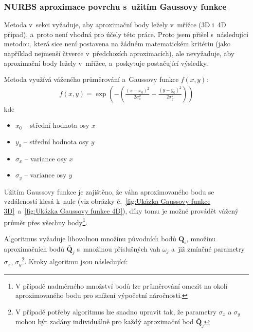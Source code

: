 \subsubsection{NURBS aproximace povrchu s~užitím Gaussovy funkce}\label{section: gauss surface approximation 3D}
Metoda v~sekci  vyžaduje, aby aproximační
body ležely v~mřížce (3D i~4D případ), a~proto není vhodná pro účely této
práce. Proto jsem přišel s~následující metodou, která sice není postavena na
žádném matematickém kritériu (jako například nejmenší čtverce v~předchozích
aproximacích), ale nevyžaduje, aby aproximační body ležely v~mřížce, a~poskytuje
postačující výsledky. \par Metoda využívá váženého průměrování a~Gaussovy
funkce $f(x, y)$:
\begin{align}
    f(x,y) = \exp\left(-\left(\frac{(x - x_0)^2}{2\sigma_x^2} + \frac{(y - y_0)^2}{2\sigma_y^2}\right)\right)
\end{align}
kde
\begin{itemize}
    \item $x_0$ -- střední hodnota osy $x$
    \item $y_0$ -- střední hodnota osy $y$
    \item $\sigma_x$ -- variance osy $x$
    \item $\sigma_y$ -- variance osy $y$
\end{itemize}
Užitím Gaussovy funkce je zajištěno, že váha aproximovaného bodu se vzdáleností klesá k~nule
(viz obrázky č.~\ref{fig:Ukázka Gaussovy funkce 3D}~a~\ref{fig:Ukázka Gaussovy funkce 4D}),
díky tomu je možné provádět vážený průměr přes všechny body\footnote{V případě nadměrného množství bodů lze průměrování omezit na okolí aproximovaného bodu pro snížení výpočetní náročnosti.}.\par
Algoritmus vyžaduje libovolnou množinu původních bodů $\bm{Q}_i$, množinu
aproximačních bodů $\bar{\bm{Q}}_j$ s~množinou příslušných vah $\omega_j$ a~již
zmíněné parametry $\sigma_x$, $\sigma_y$\footnote{V případě potřeby algoritmus lze snadno
    upravit tak, že parametry $\sigma_x$ a $\sigma_y$ mohou být zadány individuálně
    pro každý aproximační bod $\bar{\bm{Q}}_j$}. Kroky algoritmu jsou následující:

